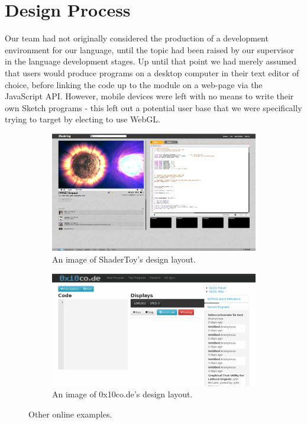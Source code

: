 \documentclass{l3proj}
\begin{document}
\section{Design Process}
\label{ide-design}
Our team had not originally considered the production of a development environment for our language, until the topic had been raised by our supervisor in the language development stages. Up until that point we had merely assumed that users would produce programs on a desktop computer in their text editor of choice, before linking the code up to the module on a web-page via the JavaScript API. However, mobile devices were left with no means to write their own Sketch programs - this left out a potential user base that we were specifically trying to target by electing to use WebGL.

\begin{figure}
\centering
\begin{subfigure}[b]{0.45\textwidth}
\includegraphics[width=\textwidth]{images/shadertoy-ide}
\caption{An image of ShaderToy's design layout.}
\label{fig:ide-shadertoy}
\end{subfigure}
\begin{subfigure}[b]{0.45\textwidth}
\includegraphics[width=\textwidth]{images/0x10code}
\caption{An image of 0x10co.de's design layout.}
\label{fig:ide-0x10code}
\end{subfigure}
\caption{Other online examples.}
\label{fig-ide-other}
\end{figure}
\end{document}
